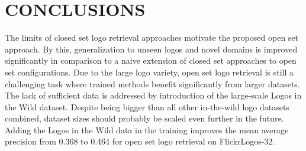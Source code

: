 \documentclass[a4paper,twoside]{article}
\begin{document}
\section{\uppercase{Conclusions}}
\label{sec:conclusion}
\noindent The limits of closed set logo retrieval approaches motivate the proposed open set approach. By this, generalization to unseen logos and novel domains is improved significantly in comparison to a naive extension of closed set approaches to open set configurations. 
Due to the large logo variety, open set logo retrieval is still a challenging task where trained methods benefit significantly from larger datasets. The lack of sufficient data is addressed by introduction of the large-scale Logos in the Wild dataset. Despite being bigger than all other in-the-wild logo datasets combined, dataset sizes should probably be scaled even further in the future. Adding the Logos in the Wild data in the training improves the mean average precision from 0.368 to 0.464 for open set logo retrieval on FlickrLogos-32.
%
\end{document}
